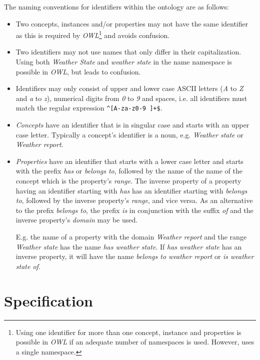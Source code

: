 The naming conventions for identifiers within the ontology are as follows:
\begin{itemize}
  \item Two concepts, instances and/or properties may not have the same identifier as this is required by \emph{OWL}\cite{OWL}\footnote{Using one identifier for more than one concept, instance and properties is possible in \emph{OWL} if an adequate number of namespaces is used. However, \thinkhomeweather uses a single namespace.} and avoids confusion.
  \item Two identifiers may not use names that only differ in their capitalization. Using both \emph{Weather State} and \emph{weather state} in the name namespace is possible in \emph{OWL}, but leads to confusion.
  \item Identifiers may only consist of upper and lower case ASCII letters (\emph{A} to \emph{Z} and \emph{a} to \emph{z}), numerical digits from \emph{0} to \emph{9} and spaces, i.e. all identifiers must match the regular expression \texttt{\textasciicircum[A-za-z0-9~]+\$}.
  \item \emph{Concepts} have an identifier that is in singular case and starts with an upper case letter. Typically a concept's identifier is a noun, e.g. \emph{Weather state} or \emph{Weather report}.
  \item \emph{Properties} have an identifier that starts with a lower case letter and starts with the prefix \emph{has} or \emph{belongs to}, followed by the name of the name of the concept which is the property's \emph{range}. The inverse property of a property having an identifier starting with \emph{has} has an identifier starting with \emph{belongs to}, followed by the inverse property's \emph{range}, and vice versa. As an alternative to the prefix \emph{belongs to}, the prefix \emph{is} in conjunction with the suffix \emph{of} and the inverse property's \emph{domain} may be used.
  
  E.g. the name of a property with the domain \emph{Weather report} and the range \emph{Weather state} has the name \emph{has weather state}. If \emph{has weather state} has an inverse property, it will have the name \emph{belongs to weather report} or \emph{is weather state of}.
\end{itemize}


\section{Specification}
\label{sec:ontology_specification}

